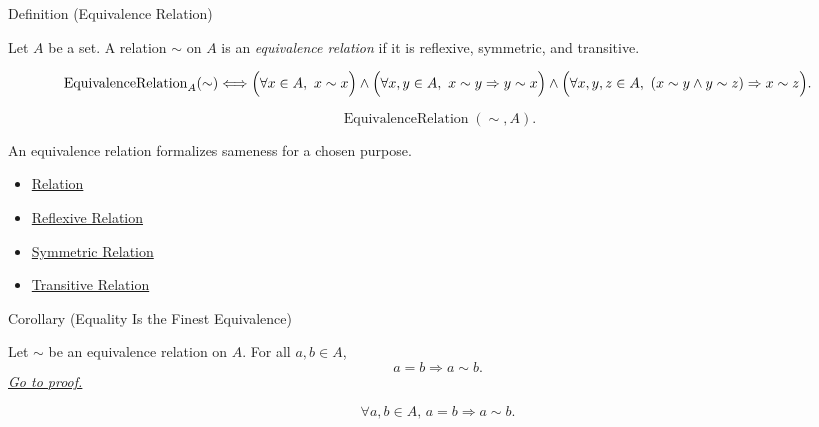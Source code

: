 \begin{definitionbox}{Definition (Equivalence Relation)}
\begin{definition}
\label{def:equivalence-relation}
Let $A$ be a set. A relation $\sim$ on $A$ is an \emph{equivalence relation}
if it is reflexive, symmetric, and transitive.
\end{definition}
\end{definitionbox}

\begin{remark*}
\[
\operatorname{EquivalenceRelation}_A(\sim)
\Longleftrightarrow
\Bigl(\forall x\in A,\ x\sim x\Bigr)
\land
\Bigl(\forall x,y\in A,\ x\sim y \Rightarrow y\sim x\Bigr)
\land
\Bigl(\forall x,y,z\in A,\ (x\sim y\land y\sim z)\Rightarrow x\sim z\Bigr).
\]
\end{remark*}

\begin{remark*}
\[
\operatorname{EquivalenceRelation}(\sim,A).
\]
\end{remark*}

\begin{remark*}[Interpretation]
An equivalence relation formalizes sameness for a chosen purpose.
\end{remark*}

\begin{dependencies}
\begin{itemize}
  \item \hyperref[def:relation]{Relation}
  \item \hyperref[def:reflexive]{Reflexive Relation}
  \item \hyperref[def:symmetric]{Symmetric Relation}
  \item \hyperref[def:transitive]{Transitive Relation}
\end{itemize}
\end{dependencies}

\begin{corollarybox}{Corollary (Equality Is the Finest Equivalence)}
\begin{corollary}
\label{cor:equality-is-finest-equivalence}
Let $\sim$ be an equivalence relation on $A$. For all $a,b\in A$,
\[
a=b \Longrightarrow a\sim b.
\]
\hyperref[prf:equality-is-finest-equivalence]{\textit{Go to proof.}}
\end{corollary}
\end{corollarybox}

\begin{remark*}
\[
\forall a,b\in A,\,
a=b\Longrightarrow a\sim b.
\]
\end{remark*}

